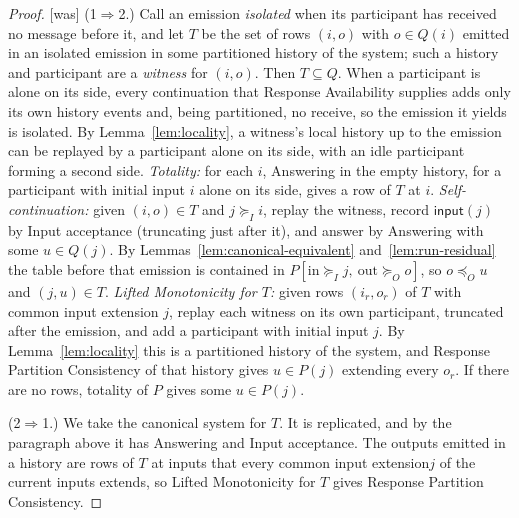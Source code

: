\documentclass[sigconf]{cidr-2027}
\theoremstyle{remark}
\newcommand{\OutputOrd}{\preceq_O}
\newcommand{\InputGe}{\succeq_I}
\newcommand{\OutputGe}{\succeq_O}
\newcommand{\inrel}{extends\xspace}          %
\newcommand{\indesc}{input extension\xspace} %
\newcommand{\outrelpart}{extending\xspace}    %
\newcommand{\fiber}[1]{P(#1)}
\begin{document}
\begin{proof}
{\footnotesize\color{black!50}\noindent\textsf{[was]} (1$\Rightarrow$2.)  Call an emission \emph{isolated} when its participant has
received no message before it, and let $T$ be the set of rows $(i,o)$ with
$o\in Q(i)$ emitted in an isolated emission in some partitioned history of the
system; such a history and participant are a \emph{witness} for $(i,o)$.
Then $T\subseteq Q$.  When a participant is alone on its side, every
continuation that Response Availability supplies adds only its own history events and,
being partitioned, no receive, so the emission it yields is isolated.  By
Lemma~\ref{lem:locality}, a witness's local history up to the emission can be
replayed by a participant alone on its side, with an idle participant
forming a second side.
\emph{Totality:} for each $i$, Answering in the empty history, for a participant
with initial input $i$ alone on its side, gives a row of $T$ at $i$.
\emph{Self-continuation:} given $(i,o)\in T$ and $j\InputGe i$, replay the
witness, record $\mathsf{input}(j)$ by Input acceptance (truncating just after
it), and answer by Answering with some $u\in Q(j)$.  By
Lemmas~\ref{lem:canonical-equivalent} and~\ref{lem:run-residual} the table
before that emission is contained in $P[\mathrm{in}\InputGe j,\
\mathrm{out}\OutputGe o]$, so $o\OutputOrd u$ and $(j,u)\in T$.
\emph{Lifted Monotonicity for $T$:} given rows $(i_r,o_r)$ of $T$ with common \indesc
$j$, replay each witness on its own participant, truncated after the
emission, and add a participant with initial input $j$.  By
Lemma~\ref{lem:locality} this is a partitioned history of the system, and
Response Partition Consistency of that history gives $u\in\fiber{j}$
\outrelpart every $o_r$.  If there are no rows, totality of $P$ gives some
$u\in\fiber{j}$.\par}

\color{blue!70!black}(2$\Rightarrow$1.)  We take the canonical system for $T$.  It is replicated, and by the
paragraph above it has Answering and Input acceptance.  The outputs emitted in
a history are rows of $T$ at inputs that every common \indesc $j$ of the
current inputs \inrel, so Lifted Monotonicity for $T$ gives Response Partition
Consistency.\color{black}


\end{proof}
\end{document}
